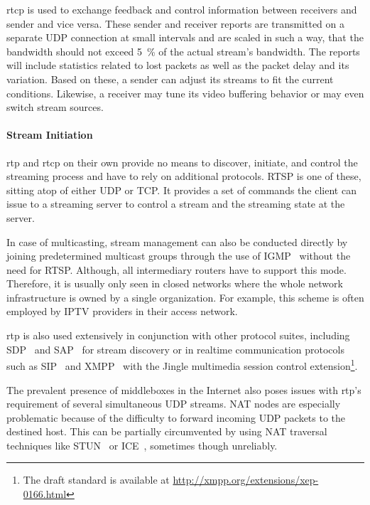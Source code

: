 \gls{rtcp} is used to exchange feedback and control information between receivers and sender and vice versa. These sender and receiver reports are transmitted on a separate \gls{UDP} connection at small intervals and are scaled in such a way, that the bandwidth should not exceed \SI{5}{\percent} of the actual stream's bandwidth. The reports will include statistics related to lost packets as well as the packet delay and its variation. Based on these, a sender can adjust its streams to fit the current conditions. Likewise, a receiver may tune its video buffering behavior or may even switch stream sources.


\paragraph{Stream Initiation}

\gls{rtp} and \gls{rtcp} on their own provide no means to discover, initiate, and control the streaming process and have to rely on additional protocols. \gls{RTSP} is one of these, sitting atop of either \gls{UDP} or \gls{TCP}. It provides a set of commands the client can issue to a streaming server to control a stream and the streaming state at the server.

In case of multicasting, stream management can also be conducted directly by joining predetermined multicast groups through the use of \gls{IGMP}~\cite{rfc4604} without the need for \gls{RTSP}. Although, all intermediary routers have to support this mode. Therefore, it is usually only seen in closed networks  where the whole network infrastructure is owned by a single organization. For example, this scheme is often employed by \gls{IPTV} providers in their access network.

\gls{rtp} is also used extensively in conjunction with other protocol suites, including \gls{SDP}~\cite{rfc2327} and \gls{SAP}~\cite{rfc2974} for stream discovery or in realtime communication protocols such as \gls{SIP}~\cite{rfc3261} and \gls{XMPP}~\cite{rfc6120,rfc6121} with the Jingle multimedia session control extension\footnote{The draft standard is available at \url{http://xmpp.org/extensions/xep-0166.html}}.

The prevalent presence of middleboxes in the Internet also poses issues with \Gls{rtp}'s requirement of several simultaneous \gls{UDP} streams. \gls{NAT} nodes are especially problematic because of the difficulty to forward incoming \gls{UDP} packets to the destined host. This can be partially circumvented by using \gls{NAT} traversal techniques like \gls{STUN}~\cite{rfc5389} or \gls{ICE}~\cite{rfc5245}, sometimes though unreliably.


